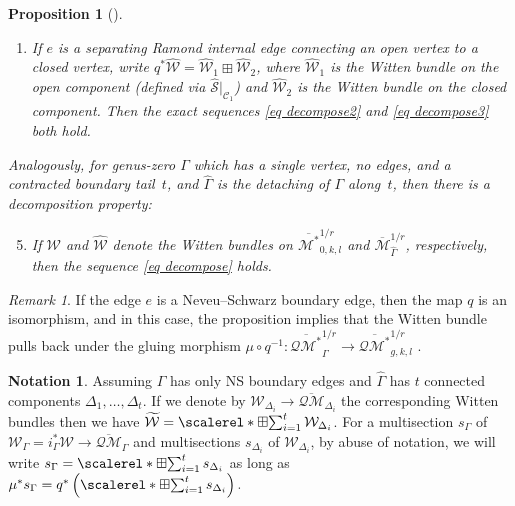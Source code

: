 \documentclass[11pt]{amsart}
\newtheorem{pr}[dummy]{Proposition}
\theoremstyle{definition}
\newtheorem{nn}[dummy]{Notation}
\theoremstyle{remark}
\newtheorem{rmk}[dummy]{Remark}
\newcommand{\oQMb}{{\overline{\mathcal{QM}}}}
\newcommand{\<}{\left<}
\renewcommand{\>}{\right>}
\numberwithin{equation}{section}
\def\Mbar{{\overline{\mathcal M}}}
\def\Mbarstar{{\overline{\mathcal M^*}}}
\DeclareMathOperator*{\bboxplus}{\scalerel*{\boxplus}{\sum}}
\begin{document}
\begin{pr}[{\cite[Proposition 2.20]{TZ1}}]
\begin{enumerate}
\item If %
$e$ is a separating Ramond internal edge connecting an open vertex to a closed vertex, write $q^*\widehat{\mathcal{W}} = \widehat{\mathcal{W}}_1 \boxplus \widehat{\mathcal{W}}_2$, where $\widehat{\mathcal{W}}_1$ is the Witten bundle on the open component (defined via $\widehat{\mathcal{S}}|_{\mathcal{C}_1}$) and $\widehat{\mathcal{W}}_2$ is the Witten bundle on the closed component.  Then the exact sequences \eqref{eq decompose2} and \eqref{eq decompose3} both hold.
\end{enumerate}
Analogously, for genus-zero $\Gamma$ which has a single vertex, no edges, and a contracted boundary tail~$t$, and $\widehat{\Gamma}$ is the detaching of $\Gamma$ along~$t$, then there is a decomposition %
property:
\begin{enumerate}
\setcounter{enumi}{4}
\item\label{it decompose cb tail} If %
${\mathcal{W}}$ and $\widehat{\mathcal{W}}$ denote the Witten bundles on $\Mbarstar_{0,k,l}^{1/r}$ and $\Mbar_{\widehat\Gamma}^{1/r}$, respectively, then the sequence \eqref{eq decompose} holds.
\end{enumerate}
\end{pr}

\begin{rmk}\label{rmk decompose NS boundary node}
If the edge $e$ is a Neveu--Schwarz boundary edge, then the map $q$ is an %
isomorphism, and in this %
case, the proposition implies that the Witten bundle pulls back under the gluing morphism $\mu\circ q^{-1}\colon\overline{\mathcal{QM}^*}_{\widehat\Gamma}^{1/r} \to \overline{\mathcal{QM}^*}_{g,k,l}^{1/r}$%
.

\end{rmk}

\begin{nn}
    Assuming $\Gamma$ %
has only NS boundary edges and $\widehat{\Gamma}$ has $t$ connected components $\Delta_1,\dots, \Delta_t$. If we denote by $\mathcal W_{\Delta_i}\to \oQMb_{\Delta_i}$ the corresponding %
Witten bundles then we %
have $\widetilde{\mathcal W}=\bboxplus_{i=1}^t \mathcal W_{\Delta_i}$. For a multisection $s_{\Gamma}$ of $\mathcal W_{\Gamma}=i_{\Gamma}^* \mathcal W \to \oQMb_{\Gamma}$ and multisections $s_{\Delta_i}$ of $\mathcal W_{\Delta_i}$, 
    by abuse of notation, we will write 
    $
     s_{\Gamma}=\bboxplus_{i=1}^t s_{\Delta_i}
    $
    as long as
    $
     \mu^*s_{\Gamma}= q^*\left(\bboxplus_{i=1}^t s_{\Delta_i} \right).
    $
\end{nn}
\end{document}
